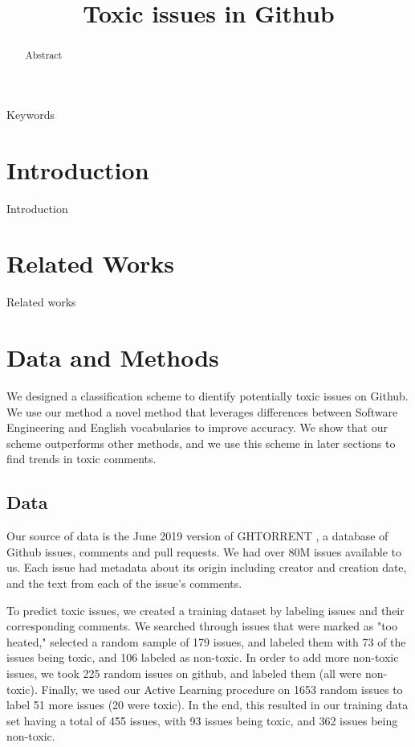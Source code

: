 \documentclass[conference]{IEEEtran}
\begin{document}
\title{Toxic issues in Github\\}

\maketitle

\begin{abstract}
Abstract 
\end{abstract}

\begin{IEEEkeywords}
Keywords 
\end{IEEEkeywords}

\section{Introduction}
Introduction
\section{Related Works}
Related works 

\section{Data and Methods}
We designed a classification scheme to dientify potentially toxic issues on Github. We use our method a novel method that leverages differences between Software Engineering and English vocabularies to improve accuracy. We show that our scheme outperforms other methods, and we use this scheme in later sections to find trends in toxic comments. 

\subsection{Data}
Our source of data is the June 2019 version of GHTORRENT \cite{b2} , a database of Github issues, comments and pull requests. We had over 80M issues available to us. Each issue had metadata about its origin including creator and creation date, and the text from each of the issue's comments. 


To predict toxic issues, we created a training dataset by labeling issues and their corresponding comments. We searched through issues that were marked as "too heated," selected a random sample of 179 issues, and labeled them with 73 of the issues being toxic, and 106 labeled as non-toxic. In order to add more non-toxic issues, we took 225 random issues on github, and labeled them (all were non-toxic). Finally, we used our Active Learning procedure on 1653 random issues to label 51 more issues (20 were toxic). In the end, this resulted in our training data set having a total of 455 issues, with 93 issues being toxic, and 362 issues being non-toxic. 
\end{document}
